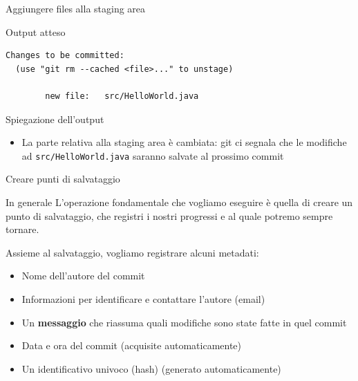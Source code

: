 \documentclass[presentation]{beamer}
\begin{document}
\begin{frame}{Aggiungere files alla staging area}
\begin{block}{Output atteso}
\begin{Verbatim}[fontsize=\scriptsize]
Changes to be committed:
  (use "git rm --cached <file>..." to unstage)

        new file:   src/HelloWorld.java	 
			\end{Verbatim}
	\end{block}
	\begin{block}{Spiegazione dell'output}
		\begin{itemize}
			\item La parte relativa alla staging area è cambiata: git ci segnala che le modifiche ad 
\texttt{src/HelloWorld.java} saranno salvate al prossimo commit
		\end{itemize}
	\end{block}
\end{frame}

\begin{frame}{Creare punti di salvataggio}
	\begin{block}{In generale}
		L'operazione fondamentale che vogliamo eseguire è quella di creare un punto di salvataggio, 
che registri i nostri progressi e al quale potremo sempre tornare.
		
		Assieme al salvataggio, vogliamo registrare alcuni metadati:
		\begin{itemize}
			\item Nome dell'autore del commit
			\item Informazioni per identificare e contattare l'autore (email)
			\item Un \textbf{messaggio} che riassuma quali modifiche sono state fatte in quel commit
			\item Data e ora del commit (acquisite automaticamente)
			\item Un identificativo univoco (hash) (generato automaticamente)
		\end{itemize}
		

\end{block}
\end{frame}
\end{document}
